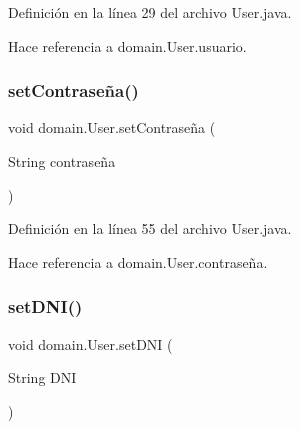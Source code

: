 Definición en la línea 29 del archivo User.\+java.


\begin{DoxyCode}{0}

\end{DoxyCode}


Hace referencia a domain.\+User.\+usuario.

\mbox{\label{classdomain_1_1User_ae292b37cef599e77881672b0b848f136}} 
\subsubsection{\texorpdfstring{setContraseña()}{setContraseña()}}
{\footnotesize\ttfamily void domain.\+User.\+set\+Contraseña (\begin{DoxyParamCaption}\item[{String}]{contraseña }\end{DoxyParamCaption})}



Definición en la línea 55 del archivo User.\+java.


\begin{DoxyCode}{0}

\end{DoxyCode}


Hace referencia a domain.\+User.\+contraseña.

\mbox{\label{classdomain_1_1User_acdb5b5bf6b571a77af5596da0da953fa}} 
\subsubsection{\texorpdfstring{setDNI()}{setDNI()}}
{\footnotesize\ttfamily void domain.\+User.\+set\+D\+NI (\begin{DoxyParamCaption}\item[{String}]{D\+NI }\end{DoxyParamCaption})}



